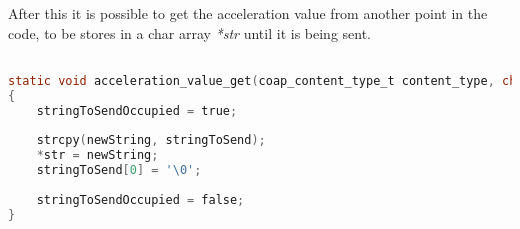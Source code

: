 After this it is possible to get the acceleration value from another point in the code, to be stores in a char array \textit{*str} until it is being sent. 


\begin{lstlisting}[language=C]

static void acceleration_value_get(coap_content_type_t content_type, char ** str)
{
	stringToSendOccupied = true; 
	
	strcpy(newString, stringToSend);
	*str = newString;
	stringToSend[0] = '\0';
	
	stringToSendOccupied = false; 
}


\end{lstlisting}



